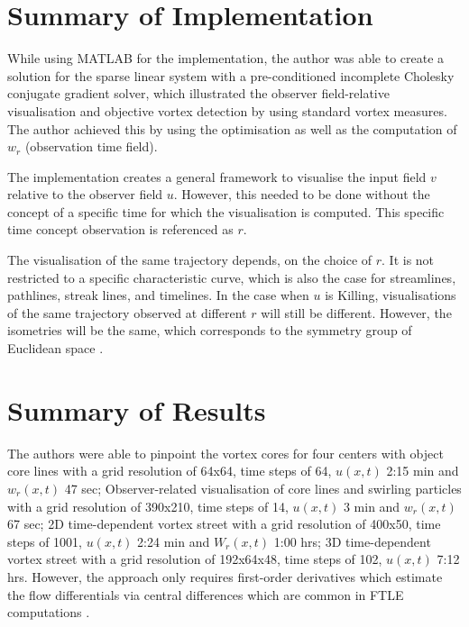 \documentclass[a4paper,9pt]{article}
\begin{document}
\section{Summary of Implementation}

While using MATLAB for the implementation, the author was able to create a solution for the sparse linear system with a pre-conditioned incomplete Cholesky conjugate gradient solver, which illustrated the observer field-relative visualisation and objective vortex detection by using standard vortex measures. The author achieved this by using the optimisation as well as the computation of $w_r$ (observation time field).

The implementation creates a general framework to visualise the input field $v$ relative to the observer field $u$. However, this needed to be done without the concept of a specific time for which the visualisation is computed. This specific time concept observation is referenced as $r$. 

The visualisation of the same trajectory depends, on the choice of $r$. It is not restricted to a specific characteristic curve, which is also the case for streamlines, pathlines, streak lines, and timelines. In the case when $u$ is Killing, visualisations of the same trajectory observed at different $r$ will still be different. However, the isometries will be the same, which corresponds to the symmetry group of Euclidean space \cite{25}. 


\section{Summary of Results}

The authors were able to pinpoint the vortex cores for four centers with object core lines with a grid resolution of 64x64, time steps of 64, $u(x,t)$ 2:15 min and $w_r(x,t)$ 47 sec; Observer-related visualisation of core lines and swirling particles with a grid resolution of 390x210, time steps of 14, $u(x,t)$ 3 min and $w_r(x,t)$ 67 sec; 2D time-dependent vortex street with a grid resolution of 400x50, time steps of 1001, $u(x,t)$ 2:24 min and $W_r(x,t)$ 1:00 hrs; 3D time-dependent vortex street with a grid resolution of 192x64x48, time steps of 102, $u(x,t)$ 7:12 hrs. However, the approach only requires first-order derivatives which estimate the flow differentials via central differences which are common in FTLE computations \cite{40}.
\end{document}
